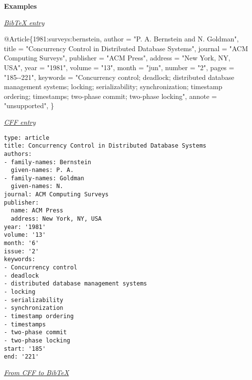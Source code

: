 \documentclass[
]{article}
\newenvironment{Shaded}{\begin{snugshade}}{\end{snugshade}}
\newcommand{\DataTypeTok}[1]{\textcolor[rgb]{0.13,0.29,0.53}{#1}}
\newcommand{\NormalTok}[1]{#1}
\newcommand{\OtherTok}[1]{\textcolor[rgb]{0.56,0.35,0.01}{#1}}
\newcommand{\StringTok}[1]{\textcolor[rgb]{0.31,0.60,0.02}{#1}}
\newcommand{\VariableTok}[1]{\textcolor[rgb]{0.00,0.00,0.00}{#1}}
\begin{document}
\textbf{Examples}

\underline{\emph{BibTeX entry}}

\begin{Shaded}
\begin{Highlighting}[]
\VariableTok{@Article}\NormalTok{\{}\OtherTok{1981:surveys:bernstein}\NormalTok{,}
  \DataTypeTok{author}\NormalTok{ =       "}\StringTok{P. A. Bernstein and N. Goldman}\NormalTok{",}
  \DataTypeTok{title}\NormalTok{ =        "}\StringTok{Concurrency Control in Distributed Database Systems}\NormalTok{",}
  \DataTypeTok{journal}\NormalTok{ =      "}\StringTok{ACM Computing Surveys}\NormalTok{",}
  \DataTypeTok{publisher}\NormalTok{ =    "}\StringTok{ACM Press}\NormalTok{",}
  \DataTypeTok{address}\NormalTok{ =      "}\StringTok{New York, NY, USA}\NormalTok{",}
  \DataTypeTok{year}\NormalTok{ =         "}\StringTok{1981}\NormalTok{",}
  \DataTypeTok{volume}\NormalTok{ =       "}\StringTok{13}\NormalTok{",}
  \DataTypeTok{month}\NormalTok{ =        "}\StringTok{jun}\NormalTok{",}
  \DataTypeTok{number}\NormalTok{ =       "}\StringTok{2}\NormalTok{",}
  \DataTypeTok{pages}\NormalTok{ =        "}\StringTok{185{-}{-}221}\NormalTok{",}
  \DataTypeTok{keywords}\NormalTok{ =     "}\StringTok{Concurrency control; deadlock; distributed database}
\StringTok{                 management systems; locking; serializability;}
\StringTok{                 synchronization; timestamp ordering; timestamps;}
\StringTok{                 two{-}phase commit; two{-}phase locking}\NormalTok{",}
  \DataTypeTok{annote}\NormalTok{ =       "}\StringTok{unsupported}\NormalTok{",}
\NormalTok{\}}
\end{Highlighting}
\end{Shaded}

\underline{\emph{CFF entry}}

\begin{verbatim}
type: article
title: Concurrency Control in Distributed Database Systems
authors:
- family-names: Bernstein
  given-names: P. A.
- family-names: Goldman
  given-names: N.
journal: ACM Computing Surveys
publisher:
  name: ACM Press
  address: New York, NY, USA
year: '1981'
volume: '13'
month: '6'
issue: '2'
keywords:
- Concurrency control
- deadlock
- distributed database management systems
- locking
- serializability
- synchronization
- timestamp ordering
- timestamps
- two-phase commit
- two-phase locking
start: '185'
end: '221'
\end{verbatim}

\underline{\emph{From CFF to BibTeX}}
\end{document}
